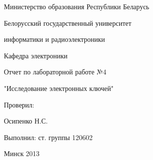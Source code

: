 \thispagestyle{empty}

\begin{center}
Министерство образования Республики Беларусь\par
\vspace{2mm}
Белорусский государственный университет\par
информатики и радиоэлектроники\par
\vspace{2mm}
Кафедра электроники\par

\end{center}

\vspace{50mm}

\begin{center}
Отчет по лабораторной работе №4\par
"Исследование электронных ключей"\par
\end{center}

\vspace{50mm}

\begin{multicols}{2}
Проверил: 

Осипенко Н.С.
\vspace{40mm}

\begin{flushright}

Выполнил: ст. группы 120602

\end{flushright}
\end{multicols}

\vspace{50mm}
\begin{center}
{Минск 2013}
\end{center}

\newpage
